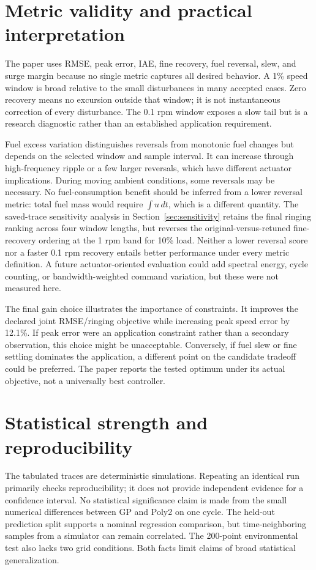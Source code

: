 \section{Metric validity and practical interpretation}
The paper uses RMSE, peak error, IAE, fine recovery, fuel reversal, slew, and surge margin because no single metric captures all desired behavior. A 1\% speed window is broad relative to the small disturbances in many accepted cases. Zero recovery means no excursion outside that window; it is not instantaneous correction of every disturbance. The 0.1 rpm window exposes a slow tail but is a research diagnostic rather than an established application requirement.

Fuel excess variation distinguishes reversals from monotonic fuel changes but depends on the selected window and sample interval. It can increase through high-frequency ripple or a few larger reversals, which have different actuator implications. During moving ambient conditions, some reversals may be necessary. No fuel-consumption benefit should be inferred from a lower reversal metric: total fuel mass would require $\int u\,dt$, which is a different quantity. The saved-trace sensitivity analysis in Section~\ref{sec:sensitivity} retains the final ringing ranking across four window lengths, but reverses the original-versus-retuned fine-recovery ordering at the 1 rpm band for 10\% load. Neither a lower reversal score nor a faster 0.1 rpm recovery entails better performance under every metric definition. A future actuator-oriented evaluation could add spectral energy, cycle counting, or bandwidth-weighted command variation, but these were not measured here.

The final gain choice illustrates the importance of constraints. It improves the declared joint RMSE/ringing objective while increasing peak speed error by 12.1\%. If peak error were an application constraint rather than a secondary observation, this choice might be unacceptable. Conversely, if fuel slew or fine settling dominates the application, a different point on the candidate tradeoff could be preferred. The paper reports the tested optimum under its actual objective, not a universally best controller.

\section{Statistical strength and reproducibility}
The tabulated traces are deterministic simulations. Repeating an identical run primarily checks reproducibility; it does not provide independent evidence for a confidence interval. No statistical significance claim is made from the small numerical differences between GP and Poly2 on one cycle. The held-out prediction split supports a nominal regression comparison, but time-neighboring samples from a simulator can remain correlated. The 200-point environmental test also lacks two grid conditions. Both facts limit claims of broad statistical generalization.

